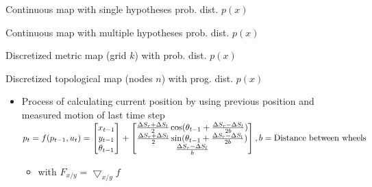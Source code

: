 \begin{itemize}
\begin{itemize}
                \begin{itemize*}
                    \item Continuous map with single hypotheses prob. dist. $p(x)$
                    \item Continuous map with multiple hypotheses prob. dist. $p(x)$
                    \item Discretized metric map (grid $k$) with prob. dist. $p(x)$
                    \item Discretized topological map (nodes $n$) with prog. dist. $p(x)$
                \end{itemize*}
        \end{itemize}
        \begin{itemize}
            \item Process of calculating current position by using previous position and measured motion of last time step
             $p_t = f(p_{t - 1}, u_t) =
    \begin{bmatrix}
        x_{t - 1}\\
        y_{t - 1}\\
        \theta_{t - 1}
    \end{bmatrix} +
    \begin{bmatrix}
        \frac{\Delta S_r + \Delta S_l}{2} \cos(\theta_{t - 1} + \frac{\Delta S_r - \Delta S_l}{2b})\\
        \frac{\Delta S_r + \Delta S_l}{2} \sin(\theta_{t - 1} + \frac{\Delta S_r - \Delta S_l}{2b})\\
        \frac{\Delta S_r - \Delta S_l}{b}
    \end{bmatrix}, \linebreak b = \text{Distance between wheels}$
                \begin{itemize}
                     $\Sigma_{p_t} = F_{p_{t-1}} \Sigma_{p_{t-1}} F_{p_{t-1}}^\transpose + F_{\Delta S} \Sigma_{\Delta S} F_{\Delta S}^\transpose$
                     $\Sigma_{\Delta S} =
                        \begin{pmatrix}
                            k_r |\Delta S_r | & 0\\
                            0 & k_l |\Delta S_l|
                        \end{pmatrix}$
                    \item with $F_{x/y} = \bigtriangledown_{x/y} f$
                \end{itemize}
        \end{itemize}
\end{itemize}

